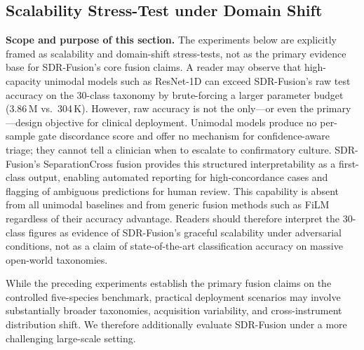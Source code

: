 \documentclass[preprint,12pt]{elsarticle}
\begin{document}
\subsection{Scalability Stress-Test under Domain Shift}
\label{ssec:cross_and_openworld}

\textbf{Scope and purpose of this section.}
The experiments below are explicitly framed as scalability and
domain-shift stress-tests, not as the primary evidence base for
SDR-Fusion's core fusion claims. A reader may observe that
high-capacity unimodal models such as ResNet-1D can exceed SDR-Fusion's
raw test accuracy on the 30-class taxonomy by brute-forcing a larger
parameter budget (3.86\,M vs.\ 304\,K). However, raw accuracy is not
the only---or even the primary---design objective for clinical
deployment. Unimodal models produce no per-sample gate discordance
score and offer no mechanism for confidence-aware triage; they
cannot tell a clinician when to escalate to confirmatory culture.
SDR-Fusion's SeparationCross fusion provides this structured
interpretability as a first-class output, enabling automated reporting
for high-concordance cases and flagging of ambiguous predictions for
human review. This capability is absent from all unimodal baselines
and from generic fusion methods such as FiLM regardless of their
accuracy advantage. Readers should therefore interpret the 30-class
figures as evidence of SDR-Fusion's graceful scalability under adversarial
conditions, not as a claim of state-of-the-art classification accuracy
on massive open-world taxonomies.

While the preceding experiments establish the primary fusion claims on
the controlled five-species benchmark, practical deployment scenarios
may involve substantially broader taxonomies, acquisition variability,
and cross-instrument distribution shift. We therefore additionally
evaluate SDR-Fusion under a more challenging large-scale setting.
\end{document}
